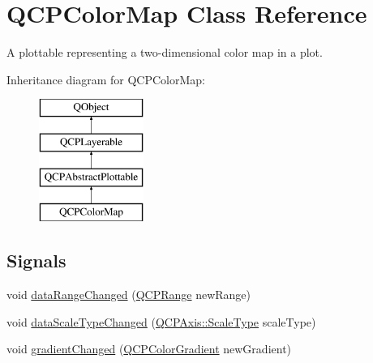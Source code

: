 \hypertarget{classQCPColorMap}{}\section{Q\+C\+P\+Color\+Map Class Reference}
\label{classQCPColorMap}


A plottable representing a two-\/dimensional color map in a plot.  


Inheritance diagram for Q\+C\+P\+Color\+Map\+:\begin{figure}[H]
\begin{center}
\leavevmode
\includegraphics[height=4.000000cm]{classQCPColorMap}
\end{center}
\end{figure}
\subsection*{Signals}
\begin{DoxyCompactItemize}
\item 
void \hyperlink{classQCPColorMap_a482980f2335d09cfb36dd95ba9663197}{data\+Range\+Changed} (\hyperlink{classQCPRange}{Q\+C\+P\+Range} new\+Range)
\item 
void \hyperlink{classQCPColorMap_a978d5d5c9f68cffef8c902b855c04490}{data\+Scale\+Type\+Changed} (\hyperlink{classQCPAxis_a36d8e8658dbaa179bf2aeb973db2d6f0}{Q\+C\+P\+Axis\+::\+Scale\+Type} scale\+Type)
\item 
void \hyperlink{classQCPColorMap_abf4797f86e422ac6e0f732c4ff1a4d49}{gradient\+Changed} (\hyperlink{classQCPColorGradient}{Q\+C\+P\+Color\+Gradient} new\+Gradient)
\end{DoxyCompactItemize}
